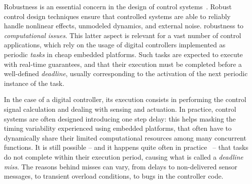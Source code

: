 Robustness is an essential concern in the design of control systems~\cite{Zhou:1998}.
Robust control design techniques ensure that controlled systems are able to reliably handle nonlinear effects, unmodeled dynamics, and external noise.
robustness to \emph{computational issues}.
This latter aspect is relevant for a vast number of control applications, which rely on the usage of digital controllers implemented as periodic \emph{tasks} in cheap embedded platforms.
Such tasks are expected to execute with real-time guarantees, and that their execution must be completed before a well-defined \emph{deadline}, usually corresponding to the activation of the next periodic instance of the task.

In the case of a digital controller, its execution consists in performing the control signal calculation and dealing with sensing and actuation.
In practice, control systems are often designed introducing one step delay:
this helps masking the timing variability experienced using embedded platforms, that often have to dynamically share their limited computational resources among many concurrent functions.
It is still possible -- and it happens quite often in practice~\cite{akesson2020empirical} -- that tasks do not complete within their execution period, causing what is called a \emph{deadline miss}.
The reasons behind misses can vary, from delays to non-delivered sensor messages, to transient overload conditions, to bugs in the controller code.

